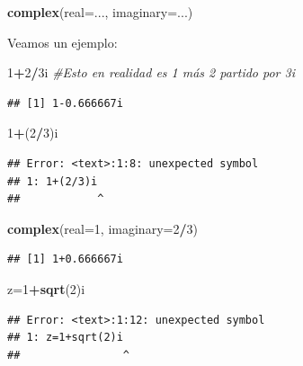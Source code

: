\documentclass[]{book}
\newenvironment{Shaded}{\begin{snugshade}}{\end{snugshade}}
\newcommand{\CommentTok}[1]{\textcolor[rgb]{0.56,0.35,0.01}{\textit{#1}}}
\newcommand{\DataTypeTok}[1]{\textcolor[rgb]{0.13,0.29,0.53}{#1}}
\newcommand{\DecValTok}[1]{\textcolor[rgb]{0.00,0.00,0.81}{#1}}
\newcommand{\KeywordTok}[1]{\textcolor[rgb]{0.13,0.29,0.53}{\textbf{#1}}}
\newcommand{\NormalTok}[1]{#1}
\newcommand{\OperatorTok}[1]{\textcolor[rgb]{0.81,0.36,0.00}{\textbf{#1}}}
\theoremstyle{definition}
\theoremstyle{definition}
\theoremstyle{definition}
\theoremstyle{remark}
\begin{document}
\begin{Shaded}
\begin{Highlighting}[]
\KeywordTok{complex}\NormalTok{(}\DataTypeTok{real=}\NormalTok{..., }\DataTypeTok{imaginary=}\NormalTok{...)}
\end{Highlighting}
\end{Shaded}

Veamos un ejemplo:

\begin{Shaded}
\begin{Highlighting}[]
\DecValTok{1}\OperatorTok{+}\DecValTok{2}\OperatorTok{/}\NormalTok{3i }\CommentTok{#Esto en realidad es 1 más 2 partido por 3i}
\end{Highlighting}
\end{Shaded}

\begin{verbatim}
## [1] 1-0.666667i
\end{verbatim}

\begin{Shaded}
\begin{Highlighting}[]
\DecValTok{1}\OperatorTok{+}\NormalTok{(}\DecValTok{2}\OperatorTok{/}\DecValTok{3}\NormalTok{)i  }
\end{Highlighting}
\end{Shaded}

\begin{verbatim}
## Error: <text>:1:8: unexpected symbol
## 1: 1+(2/3)i
##            ^
\end{verbatim}

\begin{Shaded}
\begin{Highlighting}[]
\KeywordTok{complex}\NormalTok{(}\DataTypeTok{real=}\DecValTok{1}\NormalTok{, }\DataTypeTok{imaginary=}\DecValTok{2}\OperatorTok{/}\DecValTok{3}\NormalTok{)}
\end{Highlighting}
\end{Shaded}

\begin{verbatim}
## [1] 1+0.666667i
\end{verbatim}

\begin{Shaded}
\begin{Highlighting}[]
\NormalTok{z=}\DecValTok{1}\OperatorTok{+}\KeywordTok{sqrt}\NormalTok{(}\DecValTok{2}\NormalTok{)i}
\end{Highlighting}
\end{Shaded}

\begin{verbatim}
## Error: <text>:1:12: unexpected symbol
## 1: z=1+sqrt(2)i
##                ^
\end{verbatim}
\end{document}
